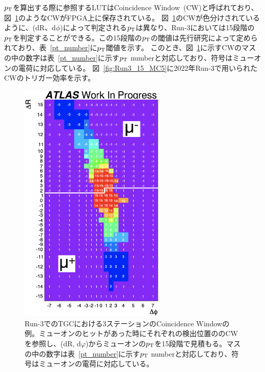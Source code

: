 $p_{\rm{T}}$を算出する際に参照するLUTはCoincidence Window~(CW)と呼ばれており、図~\ref{fig:CW}のようなCWがFPGA上に保存されている。
図~\ref{fig:CW}のCWが色分けされているように、(dR、d$\phi$)によって判定される$p_{\rm{T}}$は異なり、Run-3においては15段階の$p_{\rm{T}}$を判定することができる。この15段階の$p_{\rm{T}}$の閾値は先行研究\cite{article:shiomi-mron}によって定められており、表~\ref{pt_number}に$p_{\rm{T}}$閾値を示す。
このとき、図~\ref{fig:CW}に示すCWのマスの中の数字は表~\ref{pt_number}に示す$p_{\rm{T}}$ numberと対応しており、符号はミューオンの電荷に対応している。
図~\ref{fig:Run3_15_MC5}に2022年Run-3で用いられたCWのトリガー効率を示す。

\begin{figure}[tb]
  \centering
  \includegraphics[clip, width=7cm]{fig/3/Run3CW.pdf}
  \caption{Run-3でのTGCにおける3ステーションのCoincidence Windowの例\cite{article:shiomi-mron}。ミューオンのヒットがあった時にそれぞれの検出位置ののCWを参照し、(dR, d$φ$)からミューオンの$p_{\rm{T}}$を15段階で見積もる。マスの中の数字は表~\ref{pt_number}に示す$p_{\rm{T}}$ numberと対応しており、符号はミューオンの電荷に対応している。}
  \label{fig:CW}
\end{figure}

